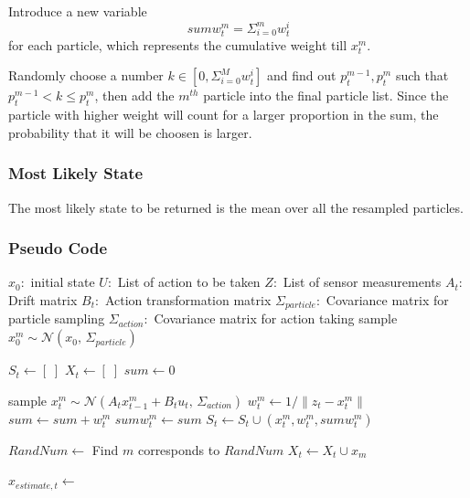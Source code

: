 \documentclass[letterpaper,11pt]{article}
\begin{document}
Introduce a new variable $$sumw_t^m = \Sigma_{i=0}^m w_t^i$$ for each particle, which represents the cumulative weight till $x_t^m$.

Randomly choose a number $k \in [0, \Sigma_{i=0}^M w_t^i]$ and find out $p_t^{m-1}, p_t^{m}$ such that $p_t^{m-1} < k \leq p_t^{m}$, then add the $m^{th}$ particle into the final particle list. Since the particle with higher weight will count for a larger proportion in the sum, the probability that it will be choosen is larger.

\subsubsection{Most Likely State}

The most likely state to be returned is the mean over all the resampled particles.


\subsubsection{Pseudo Code}
\begin{algorithm}[H]
    \begin{algorithmic}[1]
		\Require $x_0:$ initial state
		\Require $U:$ List of action to be taken
		\Require $Z:$ List of sensor measurements
		\Require $A_t:$ Drift matrix
		\Require $B_t:$ Action transformation matrix
		\Require $\Sigma_{particle}:$ Covariance matrix for particle sampling
		\Require $\Sigma_{action}:$ Covariance matrix for action taking
			 
				\State sample $x_0^m \sim \mathcal{N}(x_0,\,\Sigma_{particle})\,$
			\EndFor

			 
				\State $S_t \gets [ \; ]$
				\State $X_t \gets [ \;]$
				\State $sum \gets 0$

				 
					\State sample $x_t^m \sim \mathcal{N}(A_t x_{t-1}^m + B_t u_t,\,\Sigma_{action})$
					\State $w_t^m \gets 1 / \| z_t - x_t^m \|$
					\State $sum \gets sum + w_t^m$
					\State $sumw_t^m \gets sum$
					\State $S_t \gets S_t \cup (x_t^m, w_t^m, sumw_t^m)$
				\EndFor

				 
					\State $RandNum \gets $
					\State Find $m$ corresponds to $RandNum$
					\State $X_t \gets X_t \cup x_m$

				\EndFor


				\State $x_{estimate,t} \gets$  
			\EndFor
        \EndFunction
      \end{algorithmic}
    \end{algorithm}
\end{document}
